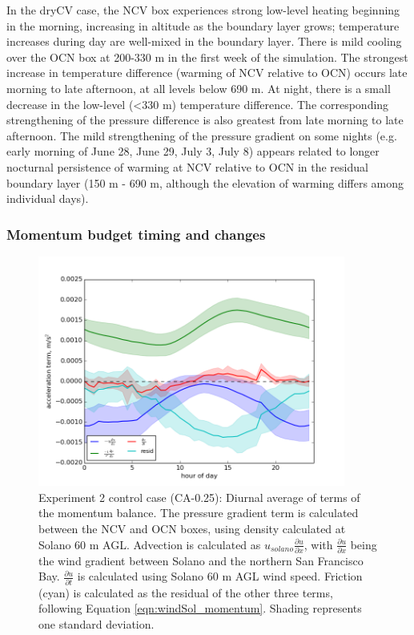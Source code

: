 In the dryCV case, the NCV box experiences strong low-level heating beginning in the morning, increasing in altitude as the boundary layer grows; temperature increases during day are well-mixed in the boundary layer.  There is mild cooling over the OCN box at 200-330 m in the first week of the simulation.  The strongest increase in temperature difference (warming of NCV relative to OCN) occurs late morning to late afternoon, at all levels below 690 m.  At night, there is a small decrease in the low-level (\textless 330 m) temperature difference.  The corresponding strengthening of the pressure difference is also greatest from late morning to late afternoon.  The mild strengthening of the pressure gradient on some nights (e.g. early morning of June 28, June 29, July 3, July 8) appears related to longer nocturnal persistence of warming at NCV relative to OCN in the residual boundary layer (150 m - 690 m, although the elevation of warming differs among individual days).

\subsubsection{Momentum budget timing and changes}

\begin{figure}[here]
\includegraphics[width=0.9\textwidth]{ch3-wind/img/momentum_terms_diurnal_0pt25.png}
\caption{Experiment 2 control case (CA-0.25): Diurnal average of terms of the momentum balance.  The pressure gradient term is calculated between the NCV and OCN boxes, using density calculated at Solano 60 m AGL.  Advection is calculated as $u_{solano}\frac{\partial u}{\partial x}$, with $\frac{\partial u}{\partial x}$ being the wind gradient between Solano and the northern San Francisco Bay.  $\frac{\partial u}{\partial t}$ is calculated using Solano 60 m AGL wind speed.  Friction (cyan) is calculated as the residual of the other three terms, following Equation \ref{eqn:windSol_momentum}.  Shading represents one standard deviation.}
\label{fig:windSol_MomTermsDiurn}
\end{figure}


